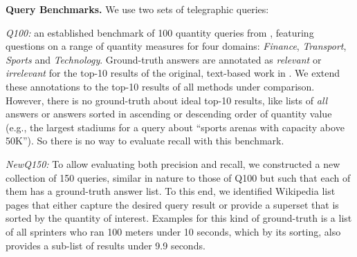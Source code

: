 \vspace{0.1cm}
\noindent \textbf{Query Benchmarks.}
We use two sets of telegraphic queries:
\squishlist
\item \textit{Q100:} an established benchmark of 100 quantity queries from \cite{DBLP:conf/semweb/HoIPBW19}, 
featuring questions on a range of quantity measures for four domains: \textit{Finance}, \textit{Transport},
\textit{Sports} and \textit{Technology}.
Ground-truth answers are annotated as \textit{relevant} or \textit{irrelevant}
for the top-10 results of the original, text-based work in \cite{DBLP:conf/semweb/HoIPBW19}.
We extend these annotations to the top-10 results of all
methods under comparison.
However, there is no ground-truth about ideal top-10 results,
like lists of {\em all} answers or answers sorted in ascending or descending order
of quantity value (e.g., the largest stadiums for a query about ``sports arenas with
capacity above 50K''). So there is no way to evaluate recall with this benchmark.
\item \textit{NewQ150:} To allow evaluating both precision and recall,
we constructed a new collection of 150 queries, similar in nature to those of Q100
but such that each of them has a ground-truth answer list.
To this end, we identified Wikipedia list pages that either capture the
desired query result or provide a superset that is sorted by the quantity of interest. Examples for this kind of ground-truth is a list of all sprinters
who ran 100 meters under 10 seconds, which by its sorting, also provides a sub-list
of results under 9.9 seconds.
\squishend


